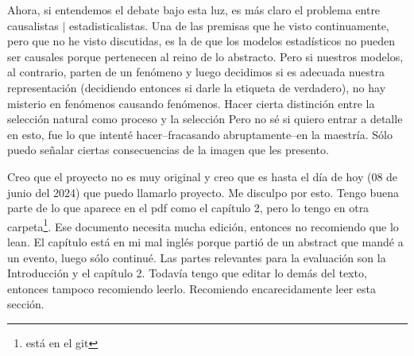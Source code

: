 Ahora, si entendemos el debate bajo esta luz, es más claro el problema entre causalistas $|$ estadisticalistas.
Una de las premisas que he visto continuamente, pero que no he visto discutidas, es la de que los modelos estadísticos no pueden ser causales porque pertenecen al reino de lo abstracto.
Pero si nuestros modelos, al contrario, parten de un fenómeno y luego decidimos si es adecuada nuestra representación (decidiendo entonces si darle la etiqueta de verdadero), no hay misterio en fenómenos causando fenómenos.
Hacer cierta distinción entre la selección natural como proceso y la selección %
Pero no sé si quiero entrar a detalle en esto, fue lo que intenté hacer--fracasando abruptamente--en la maestría.
Sólo puedo señalar ciertas consecuencias de la imagen que les presento.

Creo que el proyecto no es muy original y creo que es hasta el día de hoy (08 de junio del 2024) que puedo llamarlo proyecto.
Me disculpo por esto.
Tengo buena parte de lo que aparece en el pdf como el capítulo 2, pero lo tengo en otra carpeta\footnote{está en el git}.
Ese documento necesita mucha edición, entonces no recomiendo que lo lean.
El capítulo está en mi mal inglés porque partió de un abstract que mandé a un evento, luego sólo continué.
Las partes relevantes para la evaluación son la Introducción  y el capítulo 2.
Todavía tengo que editar lo demás del texto, entonces tampoco recomiendo leerlo.
Recomiendo encarecidamente leer esta sección.
